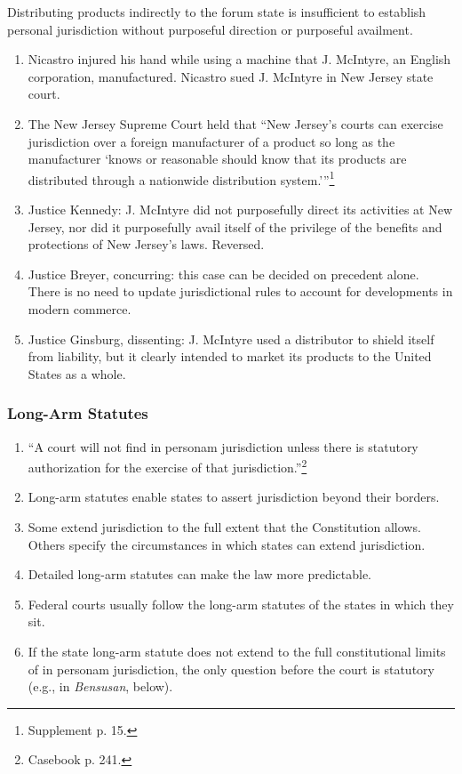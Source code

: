 Distributing products indirectly to the forum state is insufficient to 
establish personal jurisdiction without purposeful direction or purposeful 
availment.

\begin{enumerate}
    \item Nicastro injured his hand while using a machine that J. McIntyre, an 
    English corporation, manufactured. Nicastro sued J. McIntyre in New Jersey 
    state court. 
    \item The New Jersey Supreme Court held that \enquote{New Jersey's courts can 
    exercise jurisdiction over a foreign manufacturer of a product so long as 
    the manufacturer \enquote{knows or reasonable should know that its products are 
    distributed through a nationwide distribution 
    system.}}\footnote{Supplement p. 15.}
    \item Justice Kennedy: J. McIntyre did not purposefully direct its 
    activities at New Jersey, nor did it purposefully avail itself of the 
    privilege of the benefits and protections of New Jersey's laws. Reversed.
    \item Justice Breyer, concurring: this case can be decided on precedent 
    alone. There is no need to update jurisdictional rules to account for 
    developments in modern commerce.
    \item Justice Ginsburg, dissenting: J. McIntyre used a distributor to 
    shield itself from liability, but it clearly intended to market its 
    products to the United States as a whole.
\end{enumerate}

\subsubsection{Long-Arm Statutes}

\begin{enumerate}
    \item ``A court will not find in personam jurisdiction unless there is 
    statutory authorization for the exercise of that 
    jurisdiction.''\footnote{Casebook p. 241.}
    \item Long-arm statutes enable states to assert jurisdiction beyond their 
    borders.
    \item Some extend jurisdiction to the full extent that the Constitution 
    allows. Others specify the circumstances in which states can extend 
    jurisdiction.
    \item Detailed long-arm statutes can make the law more predictable.
    \item Federal courts usually follow the long-arm statutes of the states in 
    which they sit.
    \item If the state long-arm statute does not extend to the full 
    constitutional limits of in personam jurisdiction, the only question 
    before the court is statutory (e.g., in \emph{Bensusan}, below).
\end{enumerate}

